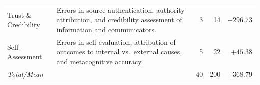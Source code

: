 \begin{tabular}{@{}p{}p{}rrr@{}}
\footnotesize Trust \& Credibility & \footnotesize Errors in source authentication, authority attribution, and credibility assessment of information and communicators. & \footnotesize 3 & \footnotesize 14 & \footnotesize $+296.73$ \\
\footnotesize Self-Assessment & \footnotesize Errors in self-evaluation, attribution of outcomes to internal vs.\ external causes, and metacognitive accuracy. & \footnotesize 5 & \footnotesize 22 & \footnotesize $+45.38$ \\
\midrule
\footnotesize \textit{Total/Mean} & & \footnotesize 40 & \footnotesize 200 & \footnotesize $+368.79$ \\
\bottomrule
\end{tabular}
